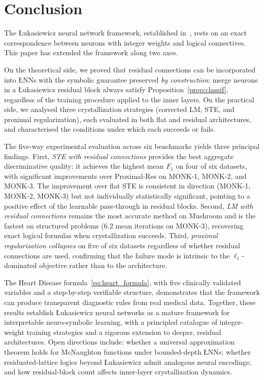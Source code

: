 \documentclass[lettersize,journal]{IEEEtran}
\newcommand{\LNN}{\L{}NN}
\begin{document}
\section{Conclusion}
\label{sec:conclusion}

The \L{}ukasiewicz neural network framework, established in~\cite{leandro2009},
rests on an exact correspondence between neurons with integer weights and
logical connectives.
This paper has extended the framework along two axes.

On the theoretical side, we proved that residual connections can be incorporated
into \LNN{}s with the symbolic guarantee preserved \emph{by construction}:
merge neurons in a \L{}ukasiewicz residual block always satisfy
Proposition~\ref{prop:classif}, regardless of the training procedure applied to
the inner layers.
On the practical side, we analysed three crystallization strategies (corrected
LM, STE, and proximal regularization), each evaluated in both flat and residual
architectures, and characterised the conditions under which each succeeds or
fails.

The five-way experimental evaluation across six benchmarks yields three
principal findings.
First, \emph{STE with residual connections} provides the best aggregate
discriminative quality: it achieves the highest mean $F_1$ on four of six
datasets, with significant improvements over Proximal-Res on MONK-1, MONK-2,
and MONK-3.
The improvement over flat STE is consistent in direction (MONK-1, MONK-2,
MONK-3) but not individually statistically significant, pointing to a positive
effect of the learnable pass-through in residual blocks.
Second, \emph{LM with residual connections} remains the most accurate method
on Mushroom and is the fastest on structured problems (6.2 mean iterations on
MONK-3), recovering exact logical formulas when crystallization succeeds.
Third, \emph{proximal regularization collapses} on five of six datasets
regardless of whether residual connections are used, confirming that the failure
mode is intrinsic to the $\ell_1$-dominated objective rather than to the
architecture.

The Heart Disease formula~\eqref{eq:heart_formula}, with five clinically
validated variables and a step-by-step verifiable structure, demonstrates that
the framework can produce transparent diagnostic rules from real medical data.
Together, these results establish \L{}ukasiewicz neural networks as a mature
framework for interpretable neuro-symbolic learning, with a principled
catalogue of integer-weight training strategies and a rigorous extension to
deeper, residual architectures.
Open directions include: whether a universal approximation theorem holds for
McNaughton functions under bounded-depth \LNN{}s; whether residuated-lattice
logics beyond \L{}ukasiewicz admit analogous neural encodings; and how
residual-block count affects inner-layer crystallization dynamics.
\end{document}
